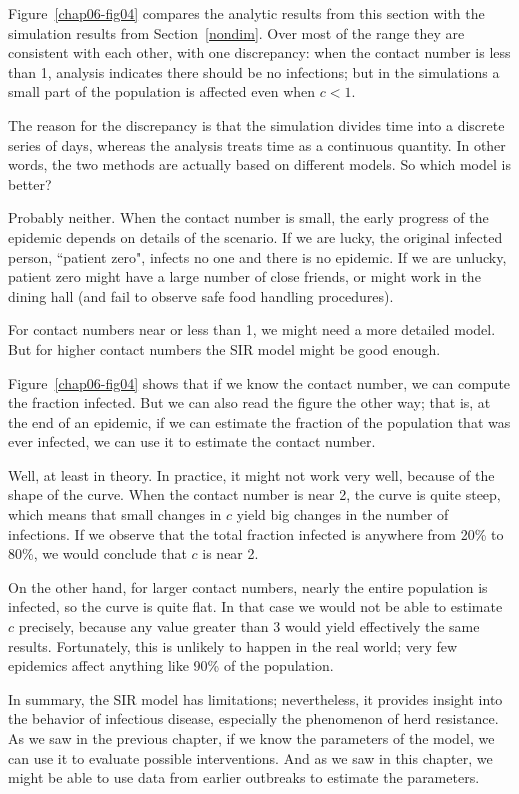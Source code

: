 \documentclass[12pt]{book}
\theoremstyle{exercise}
\begin{document}
Figure~\ref{chap06-fig04} compares the analytic results from this section with the simulation results from Section~\ref{nondim}.  Over most of the range they are consistent with each other, with one discrepancy: when the contact number is less than 1, analysis indicates there should be no infections; but in the simulations a small part of the population is affected even when $c<1$.

The reason for the discrepancy is that the simulation divides time into a discrete series of days, whereas the analysis treats time as a continuous quantity.  In other words, the two methods are actually based on different models.  So which model is better?

Probably neither.  When the contact number is small, the early progress of the epidemic depends on details of the scenario.  If we are lucky, the original infected person, ``patient zero",  infects no one and there is no epidemic.  If we are unlucky, patient zero might have a large number of close friends, or might work in the dining hall (and fail to observe safe food handling procedures).

For contact numbers near or less than 1, we might need a more detailed model.  But for higher contact numbers the SIR model might be good enough.

Figure~\ref{chap06-fig04} shows that if we know the contact number, we can compute the fraction infected.  But we can also read the figure the other way; that is, at the end of an epidemic, if we can estimate the fraction of the population that was ever infected, we can use it to estimate the contact number.

Well, at least in theory.  In practice, it might not work very well, because of the shape of the curve.  When the contact number is near 2, the curve is quite steep, which means that small changes in $c$ yield big changes in the number of infections.  If we observe that the total fraction infected is anywhere from 20\% to 80\%, we would conclude that $c$ is near 2.

On the other hand, for larger contact numbers, nearly the entire population is infected, so the curve is quite flat.  In that case we would not be able to estimate $c$ precisely, because any value greater than 3 would yield effectively the same results.  Fortunately, this is unlikely to happen in the real world; very few epidemics affect anything like 90\% of the population.

In summary, the SIR model has limitations; nevertheless, it provides insight into the behavior of infectious disease, especially the phenomenon of herd resistance.  As we saw in the previous chapter, if we know the parameters of the model, we can use it to evaluate possible interventions.  And as we saw in this chapter, we might be able to use data from earlier outbreaks to estimate the parameters.
\end{document}

